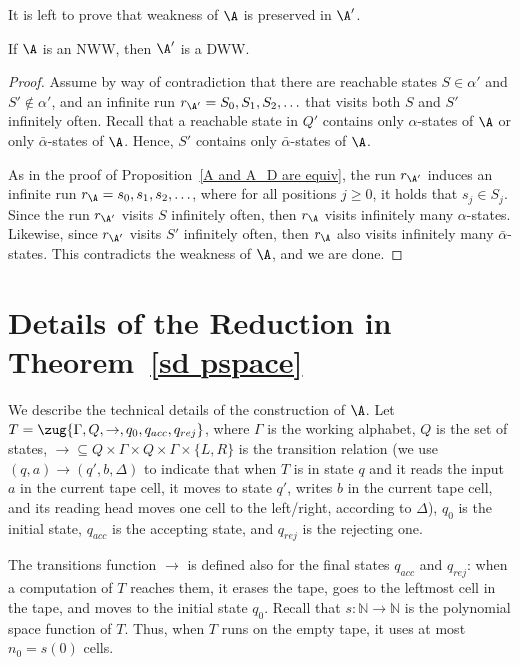 \documentclass{lmcs}
\begin{document}
It is left to prove that weakness of $\A$ is preserved in $\A'$. 

\begin{prop}\label{NWW to DWW}
	If $\A$ is an NWW, then $\A'$ is a DWW.
\end{prop}

\begin{proof}
	Assume by way of contradiction that there are reachable states $S\in \alpha'$ and $S'\notin \alpha'$, and an infinite run $r_{\A'} = S_0, S_1, S_2, \ldots$ that visits both $S$ and $S'$ infinitely often. 
	Recall that a reachable state in $Q'$ contains only $\alpha$-states of $\A$ or only $\bar{\alpha}$-states of $\A$. Hence, $S'$ contains only $\bar{\alpha}$-states of $\A$. 
	
	As in the proof of Proposition~\ref{A and A_D are equiv}, the run $r_{\A'}$ induces an infinite run $r_\A = s_0, s_1, s_2, \ldots $, where for all positions $j \geq 0$, it holds that $s_j\in S_j$. Since the run $r_{\A'}$ visits $S$ infinitely often, then $r_\A$ visits infinitely many $\alpha$-states. Likewise, since $r_{\A'}$ visits  $S'$ infinitely often, then $r_\A$ also visits infinitely many $\bar{\alpha}$-states. This contradicts the weakness of $\A$, and we are done.
\end{proof}

\section{Details of the Reduction in Theorem~\ref{sd pspace}}
\label{app tm}


We describe the technical details of the construction of $\A$.
Let $T=\zug{\Gamma,Q,\rightarrow,q_0,q_{acc},q_{rej}}$, where $\Gamma$ is the working
alphabet, $Q$ is the set of states, $\rightarrow \subseteq Q \times
\Gamma \times Q \times \Gamma \times \{L,R\}$ is the transition
relation (we use $(q,a) \rightarrow (q',b,\Delta)$ to indicate that
when $T$ is in state $q$ and it reads the input $a$ in the current
tape cell, it moves to state $q'$, writes $b$ in the current tape
cell, and its reading head moves one cell to the left/right, according
to $\Delta$), $q_0$ is the initial state, $q_{acc}$ is the accepting state, and $q_{rej}$ is the rejecting one. 

The transitions function $\rightarrow$ is defined also for the final states $q_{acc}$ and $q_{rej}$: when a computation of $T$ reaches them, it erases the tape, goes to the leftmost cell in the tape, 
and moves to the initial state $q_0$. Recall that $s: \mathbb{N} \rightarrow \mathbb{N}$ is the polynomial space function of $T$. Thus, when $T$ runs on the empty tape, it uses at most $n_0=s(0)$ cells. 
\end{document}
